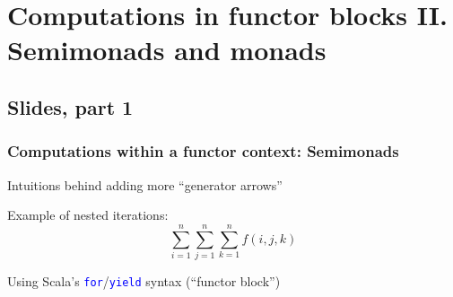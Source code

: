 
\chapter{Computations in functor blocks II. Semimonads and monads}

\section{Slides, part 1}

\subsection{Computations within a functor context: Semimonads}

Intuitions behind adding more ``generator arrows''

Example of nested iterations: {\footnotesize{}
\[
\sum_{i=1}^{n}\sum_{j=1}^{n}\sum_{k=1}^{n}f(i,j,k)
\]
}{\footnotesize\par}

Using Scala's \texttt{\textcolor{blue}{\footnotesize{}for}}/\texttt{\textcolor{blue}{\footnotesize{}yield}}
syntax (``functor block'')

